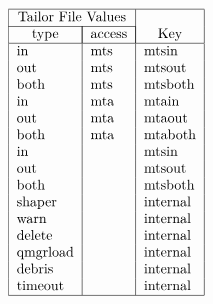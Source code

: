 \[\begin{tabular} {|l|l|l|}
\hline
	\multicolumn{2}{|c|}{Tailor File Values} & \\ 
	\cline{1-2}
	\multicolumn{1}{|c|}{type} &
		\multicolumn{1}{|c|}{access} & 
			\multicolumn{1}{|c|}{Key} \\
\hline
	in & mts & mtsin \\
	out & mts & mtsout \\
	both & mts & mtsboth \\
	in & mta & mtain \\
	out & mta & mtaout \\
	both & mta & mtaboth \\
	in &  & mtsin \\
	out & & mtsout \\
	both & & mtsboth \\
	shaper & & internal \\
	warn & & internal \\
	delete & & internal \\
	qmgrload & & internal \\
	debris & & internal \\
	timeout & & internal \\
\hline
\end{tabular}\]
	
